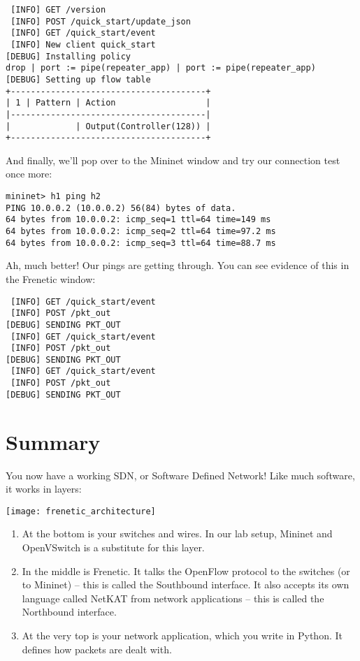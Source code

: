 \begin{verbatim}
 [INFO] GET /version
 [INFO] POST /quick_start/update_json
 [INFO] GET /quick_start/event
 [INFO] New client quick_start
[DEBUG] Installing policy
drop | port := pipe(repeater_app) | port := pipe(repeater_app)
[DEBUG] Setting up flow table
+---------------------------------------+
| 1 | Pattern | Action                  |
|---------------------------------------|
|             | Output(Controller(128)) |
+---------------------------------------+
\end{verbatim}

And finally, we'll pop over to the Mininet window and try our connection test once more:

\begin{verbatim}
mininet> h1 ping h2
PING 10.0.0.2 (10.0.0.2) 56(84) bytes of data.
64 bytes from 10.0.0.2: icmp_seq=1 ttl=64 time=149 ms
64 bytes from 10.0.0.2: icmp_seq=2 ttl=64 time=97.2 ms
64 bytes from 10.0.0.2: icmp_seq=3 ttl=64 time=88.7 ms
\end{verbatim}

Ah, much better! 
Our pings are getting through.  
You can see evidence of this in the Frenetic window:

\begin{verbatim}
 [INFO] GET /quick_start/event
 [INFO] POST /pkt_out
[DEBUG] SENDING PKT_OUT
 [INFO] GET /quick_start/event
 [INFO] POST /pkt_out
[DEBUG] SENDING PKT_OUT
 [INFO] GET /quick_start/event
 [INFO] POST /pkt_out
[DEBUG] SENDING PKT_OUT
\end{verbatim}

\section{Summary}

You now have a working SDN, or Software Defined Network!   Like much software, it works in layers:

\texttt{[image: frenetic\_architecture]}

\begin{enumerate}
\item At the bottom is your switches and wires.  In our lab setup, Mininet and OpenVSwitch is a substitute for this layer.
\item In the middle is Frenetic.  It talks the OpenFlow protocol to the switches (or to Mininet) -- this is called the Southbound interface.  It also accepts its own language called NetKAT from network applications -- this is called the Northbound interface.
\item At the very top is your network application, which you write in Python.  It defines how packets are dealt with.
\end{enumerate}

